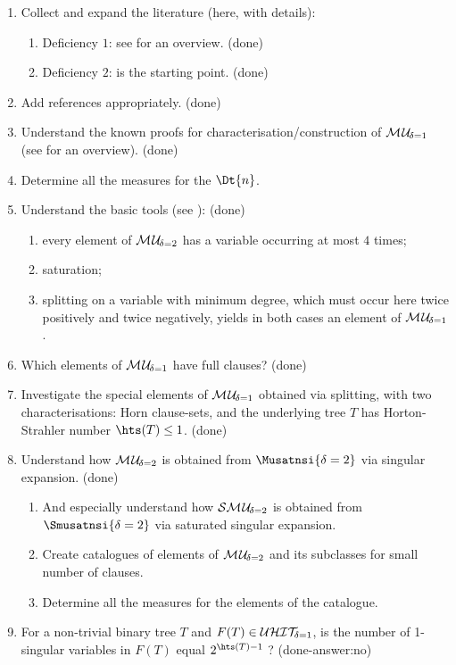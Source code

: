 \documentclass{article}
\begin{document}
\begin{enumerate}
\item Collect and expand the literature (here, with details):
  \begin{enumerate}
  \item Deficiency $1$: see \cite{KullmannZhao2010Extremal} for an overview. (done)
  \item Deficiency $2$: \cite{KleineBuening2000SubclassesMU} is the starting point. (done)
  \end{enumerate}
\item Add references appropriately. (done)
\item Understand the known proofs for characterisation/construction of $\mathcal{M\hspace{0.8pt}U}_{\!\delta=1}$ (see \cite{KullmannZhao2010Extremal} for an overview). (done)
\item Determine all the measures for the $\Dt{n}$.
\item Understand the basic tools (see \cite{KullmannZhao2010Extremal}): (done)
  \begin{enumerate}
  \item every element of $\mathcal{M\hspace{0.8pt}U}_{\!\delta=2}$ has a variable occurring at most $4$ times;
  \item saturation;
  \item splitting on a variable with minimum degree, which must occur here twice positively and twice negatively, yields in both cases an element of $\mathcal{M\hspace{0.8pt}U}_{\!\delta=1}$.
  \end{enumerate}
\item Which elements of $\mathcal{M\hspace{0.8pt}U}_{\!\delta=1}$ have full clauses? (done)
\item Investigate the special elements of $\mathcal{M\hspace{0.8pt}U}_{\!\delta=1}$ obtained via splitting, with two characterisations: Horn clause-sets, and the underlying tree $T$ has Horton-Strahler number $\hts(T) \le 1$. (done)
\item Understand how $\mathcal{M\hspace{0.8pt}U}_{\!\delta=2}$ is obtained from $\Musatnsi{\delta=2}$ via singular expansion. (done)
  \begin{enumerate}
  \item And especially understand how $\mathcal{S}\mathcal{M\hspace{0.8pt}U}_{\!\delta=2}$ is obtained from $\Smusatnsi{\delta=2}$ via saturated singular expansion.
  \item Create catalogues of elements of $\mathcal{M\hspace{0.8pt}U}_{\!\delta=2}$ and its subclasses for small number of clauses.
  \item Determine all the measures for the elements of the catalogue.
  \end{enumerate}
\item For a non-trivial binary tree $T$ and $F(T) \in \mathcal{U}\mathcal{HIT}_{\!\!\delta=1}$, is the number of 1-singular variables in $F(T)$ equal $2^{\hts(T)-1}$ ? (done-answer:no)

\end{enumerate}
\end{document}
